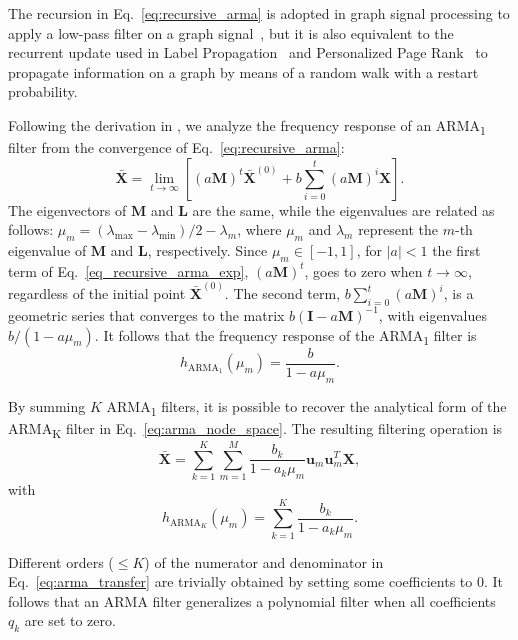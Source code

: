 \documentclass{article}
\def\X{{\mathbf X}}
\def\M{{\mathbf M}}
\def\L{{\mathbf L}}
\def\I{{\mathbf I}}
\def\L{{\mathbf L}}
\begin{document}
The recursion in Eq.~\eqref{eq:recursive_arma} is adopted in graph signal processing to apply a low-pass filter on a graph signal~\cite{loukas2015distributed,isufi2016autoregressive}, but it is also equivalent to the recurrent update used in Label Propagation~\cite{zhou2004learning} and Personalized Page Rank~\cite{page1999pagerank} to propagate information on a graph by means of a random walk with a restart probability.

Following the derivation in \cite{isufi2016autoregressive}, we analyze the frequency response of an ARMA\textsubscript{1} filter from the convergence of Eq.~\eqref{eq:recursive_arma}: 
\begin{equation}
    \label{eq_recursive_arma_exp}
    \bar{\X} = \lim_{t \rightarrow \infty} \left[ (a\mathbf{M})^t \bar{\X}^{(0)} + b \sum \limits_{i=0}^t (a\mathbf{M})^i\X \right].
\end{equation}
The eigenvectors of $\M$ and $\L$ are the same, while the eigenvalues are related as follows: $\mu_m = (\lambda_\text{max} - \lambda_\text{min})/2 - \lambda_m$, where $\mu_m$ and $\lambda_m$ represent the $m$-th eigenvalue of $\M$ and $\L$, respectively. 
Since $\mu_m \in [-1,1]$, for $\lvert a \rvert < 1$ the first term of Eq.~\eqref{eq_recursive_arma_exp}, $(a\mathbf{M})^t$, goes to zero when $t \rightarrow \infty$, regardless of the initial point $\bar{\X}^{(0)}$.
The second term, $b \sum_{i=0}^t (a\mathbf{M})^i$, is a geometric series that converges to the matrix $b(\I - a\mathbf{M})^{-1}$, with eigenvalues $b/(1-a\mu_m)$.
It follows that the frequency response of the ARMA\textsubscript{1} filter is
\begin{equation}
    \label{eq:arma1_response}
    h_{\text{ARMA}_1}(\mu_m) = \frac{b}{1 - a\mu_m}. \end{equation}


By summing $K$ ARMA\textsubscript{1} filters, it is possible to recover the analytical form of the ARMA\textsubscript{K} filter in Eq.~\eqref{eq:arma_node_space}.
The resulting filtering operation is
\begin{equation}
    \label{eq:arma_filter}
    \bar{\X} = \sum \limits_{k=1}^K \sum \limits_{m=1}^M \frac{b_k}{1 - a_k\mu_m} \mathbf{u}_m \mathbf{u}_m^T \X,
\end{equation}
with 
\begin{equation}
    h_{\text{ARMA}_{K}}(\mu_m) = \sum_{k=1}^K \frac{b_k}{1 - a_k \mu_m}.
\end{equation}


Different orders ($\leq K$) of the numerator and denominator in Eq.~\eqref{eq:arma_transfer} are trivially obtained by setting some coefficients to 0. 
It follows that an ARMA filter generalizes a polynomial filter when all coefficients $q_k$ are set to zero.
\end{document}
